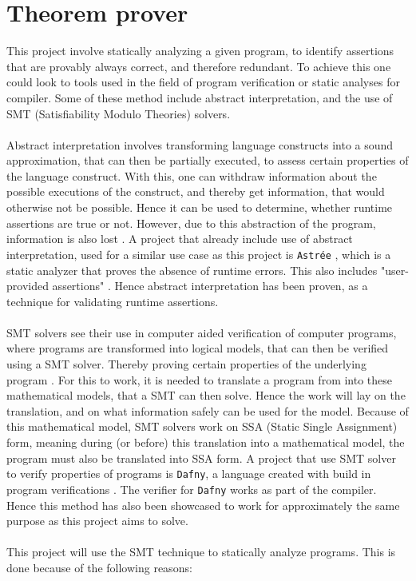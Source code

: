 
\section{Theorem prover } \label{sec:z3}
This project involve statically analyzing a given program, to identify assertions that are
provably always correct, and therefore redundant. To achieve this one could look to tools used in
the field of program verification or static analyses for compiler.
Some of these method include abstract interpretation, and the use of SMT
(Satisfiability Modulo Theories) solvers.
\\
\\
Abstract interpretation involves transforming language constructs into a sound approximation,
that can then be partially executed, to assess certain properties of the language construct.
With this, one can withdraw information about the possible executions of the construct, and
thereby get information, that would otherwise not be possible. Hence it can be used to determine,
whether runtime assertions are true or not. However, due to this abstraction of the program,
information is also lost \cite{ai}. A project that already include use of abstract interpretation,
used for a similar use case as this project is \texttt{Astrée} \cite{astree}, which is a static
analyzer that proves the absence of runtime errors. This also includes "user-provided assertions"
\cite{astree}. Hence abstract interpretation has been proven, as a technique for validating
runtime assertions.
\\
\\
SMT solvers see their use in computer aided verification of computer programs, where programs
are transformed into logical models, that can then be verified using a SMT solver. Thereby proving
certain properties of the underlying program \cite{sigda}. For this to work, it is needed to
translate a program from \lan into these mathematical models, that a SMT can then solve. Hence
the work will lay on the translation, and on what information safely can be used for the model.
Because of this mathematical model, SMT solvers work on SSA (Static Single Assignment) form,
meaning during (or before) this translation into a mathematical model, the \lan program must also
be translated into SSA form. A project that use SMT solver to verify properties of programs is
\texttt{Dafny}, a language created with build in program verifications \cite{dafny}. The verifier
for \texttt{Dafny} works as part of the compiler. Hence this method has also been showcased to work
for approximately the same purpose as this project aims to solve.
\\
\\
This project will use the SMT technique to statically analyze \lan programs. This is done because
of the following reasons:

